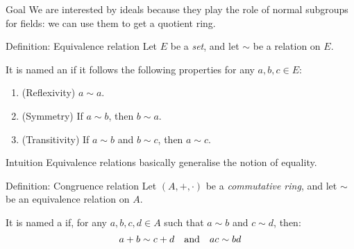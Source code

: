 \documentclass[a4paper]{article}
\begin{document}
\begin{parag}{Goal}
    We are interested by ideals because they play the role of normal subgroups for fields: we can use them to get a quotient ring.
\end{parag}


\begin{parag}{Definition: Equivalence relation}
    Let $E$ be a \textit{set}, and let $\sim$ be a relation on $E$.

    It is named an  if it follows the following properties for any $a, b, c \in E$:
    \begin{enumerate}
        \item (Reflexivity) $a \sim a$.
        \item (Symmetry) If $a \sim b$, then $b \sim a$.
        \item (Transitivity) If $a\sim b$ and $b \sim c$, then $a \sim c$.
    \end{enumerate}
    
    \begin{subparag}{Intuition}
        Equivalence relations basically generalise the notion of equality.
    \end{subparag}
\end{parag}

\begin{parag}{Definition: Congruence relation}
    Let $\left(A, + , \cdot \right)$ be a \textit{commutative ring}, and let $\sim$ be an equivalence relation on $A$.

    It is named a  if, for any $a, b, c, d \in A$ such that $a \sim b$ and $c \sim d$, then: 
    \[a + b \sim c + d \quad \text{and} \quad ac \sim bd\]
\end{parag}
\end{document}
